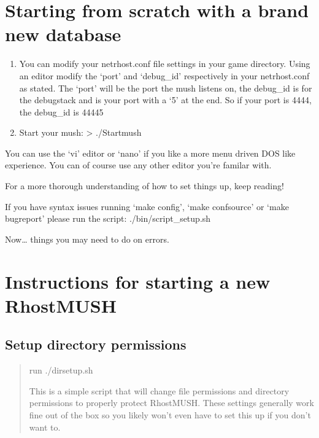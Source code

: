 \documentclass[letterpaper,10pt,english]{sphinxmanual}
\begin{document}
\section{Starting from scratch with a brand new database}
\label{\detokenize{24-quickinstall:starting-from-scratch-with-a-brand-new-database}}\begin{enumerate}
%
\item {} 
\sphinxAtStartPar
You can modify your netrhost.conf file settings in your game directory.
Using an editor modify the ‘port’ and ‘debug\_id’ respectively in your netrhost.conf as stated.
The ‘port’ will be the port the mush listens on, the debug\_id is for the debug\sphinxhyphen{}stack and is
your port with a ‘5’ at the end.  So if your port is 4444, the debug\_id is 44445

\item {} 
\sphinxAtStartPar
Start your mush:
\textendash{}\textgreater{} ./Startmush

\end{enumerate}

\sphinxAtStartPar
You can use the ‘vi’ editor or ‘nano’ if you like a more menu driven DOS like experience.
You can of course use any other editor you’re familar with.

\sphinxAtStartPar
For a more thorough understanding of how to set things up, keep reading!

\sphinxAtStartPar
If you have syntax issues running ‘make config’, ‘make confsource’
or ‘make bugreport’ please run the script: ./bin/script\_setup.sh

\sphinxAtStartPar
Now… things you may need to do on errors.


\section{Instructions for starting a new RhostMUSH}
\label{\detokenize{24-quickinstall:instructions-for-starting-a-new-rhostmush}}

\subsection{Setup directory permissions}
\label{\detokenize{24-quickinstall:setup-directory-permissions}}\begin{quote}

\sphinxAtStartPar
run ./dirsetup.sh

\sphinxAtStartPar
This is a simple script that will change file permissions
and directory permissions to properly protect RhostMUSH.
These settings generally work fine out of the box so
you likely won’t even have to set this up if you don’t want to.
\end{quote}
\end{document}
